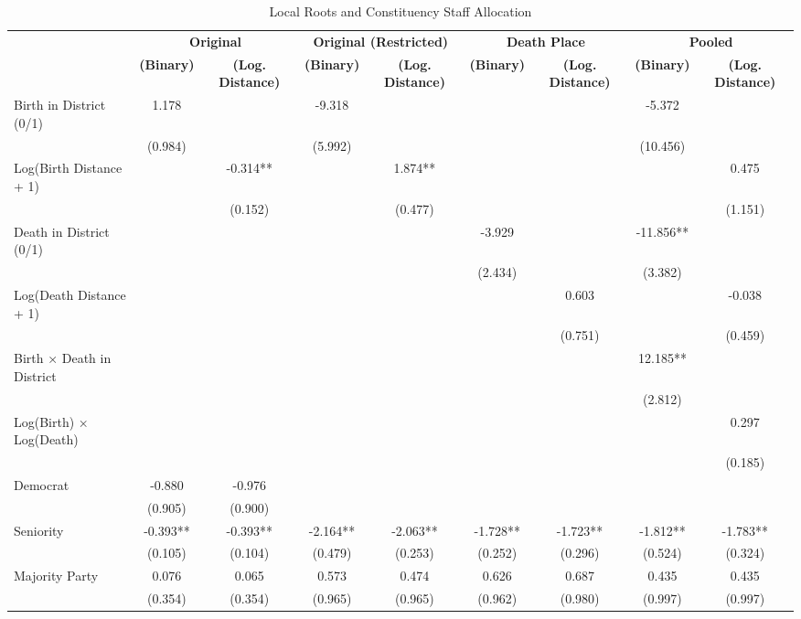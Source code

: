 \begin{table}[t]
\caption{Local Roots and Constituency Staff Allocation} 
\fontsize{9.0pt}{11.0pt}\selectfont
\begin{tabular*}{\linewidth}{@{\extracolsep{\fill}}lcccccccc}
\toprule
 & \multicolumn{2}{c}{{\bfseries \textbf{Original}}} & \multicolumn{2}{c}{{\bfseries \textbf{Original (Restricted)}}} & \multicolumn{2}{c}{{\bfseries \textbf{Death Place}}} & \multicolumn{2}{c}{{\bfseries \textbf{Pooled}}} \\ 
\cmidrule(lr){2-3} \cmidrule(lr){4-5} \cmidrule(lr){6-7} \cmidrule(lr){8-9}
{\bfseries  } & {\bfseries (Binary)} & {\bfseries (Log. Distance)} & {\bfseries (Binary)} & {\bfseries (Log. Distance)} & {\bfseries (Binary)} & {\bfseries (Log. Distance)} & {\bfseries (Binary)} & {\bfseries (Log. Distance)} \\ 
\midrule\addlinespace[2.5pt]
Birth in District (0/1) & 1.178 &  & -9.318 &  &  &  & -5.372 &  \\ 
 & (0.984) &  & (5.992) &  &  &  & (10.456) &  \\ 
Log(Birth Distance + 1) &  & -0.314** &  & 1.874** &  &  &  & 0.475 \\ 
 &  & (0.152) &  & (0.477) &  &  &  & (1.151) \\ 
Death in District (0/1) &  &  &  &  & -3.929 &  & -11.856** &  \\ 
 &  &  &  &  & (2.434) &  & (3.382) &  \\ 
Log(Death Distance + 1) &  &  &  &  &  & 0.603 &  & -0.038 \\ 
 &  &  &  &  &  & (0.751) &  & (0.459) \\ 
Birth × Death in District &  &  &  &  &  &  & 12.185** &  \\ 
 &  &  &  &  &  &  & (2.812) &  \\ 
Log(Birth) × Log(Death) &  &  &  &  &  &  &  & 0.297 \\ 
 &  &  &  &  &  &  &  & (0.185) \\ 
Democrat & -0.880 & -0.976 &  &  &  &  &  &  \\ 
 & (0.905) & (0.900) &  &  &  &  &  &  \\ 
Seniority & -0.393** & -0.393** & -2.164** & -2.063** & -1.728** & -1.723** & -1.812** & -1.783** \\ 
 & (0.105) & (0.104) & (0.479) & (0.253) & (0.252) & (0.296) & (0.524) & (0.324) \\ 
Majority Party & 0.076 & 0.065 & 0.573 & 0.474 & 0.626 & 0.687 & 0.435 & 0.435 \\ 
 & (0.354) & (0.354) & (0.965) & (0.965) & (0.962) & (0.980) & (0.997) & (0.997) \\ 

\end{tabular*}
\end{table}
